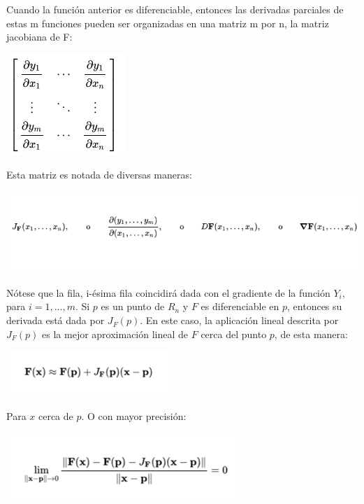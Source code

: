 \documentclass[11pt,a4paper,oldfontcommands,oneside]{memoir}
\begin{document}
Cuando la función anterior es diferenciable, entonces las derivadas parciales de estas m funciones pueden ser organizadas en una matriz m por n, la matriz jacobiana de F: \\

\begin{center}
\includegraphics[scale=1]{9.png} 
\end{center}

Esta matriz es notada de diversas maneras:

\begin{flushleft}
\includegraphics[scale=.85]{10.png}
\end{flushleft}


Nótese que la fila, i-ésima fila coincidirá dada con el gradiente de la función $Y_i$, para $i = 1,...,m$. Si $p$ es un punto de $R_n$ y $F$ es diferenciable en $p$, entonces su derivada está dada por $J_F (p)$. En este caso, la aplicación lineal descrita por $J_F (p)$ es la mejor aproximación lineal de $F$ cerca del punto $p$, de esta manera:

\begin{center}
\includegraphics[scale=1.25]{11.png}
\end{center}

Para $x$ cerca de $p$. O con mayor precisión:

\begin{center}
\includegraphics[scale=1.25]{12.png} \\
\end{center}

\vspace{2cm}
\hfill



\end{document}
